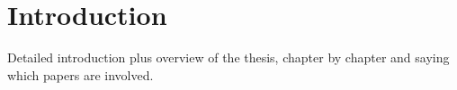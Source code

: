 \chapter*{Introduction}
Detailed introduction plus overview of the thesis, chapter by chapter and saying which papers are involved.